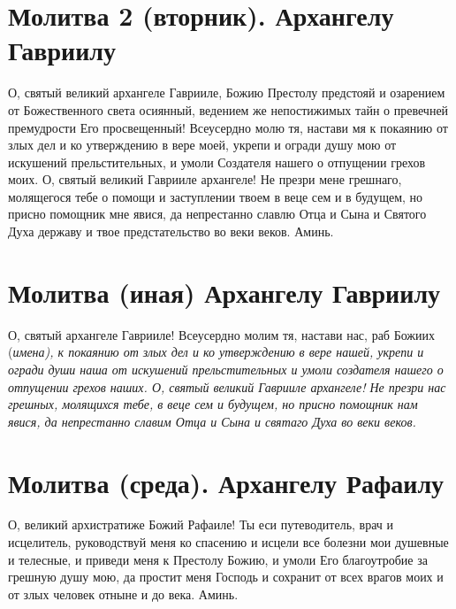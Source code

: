 \section{Молитва 2 (вторник).    Архангелу Гавриилу}\begin{mymulticols}
 


О, святый великий архангеле Гаврииле, Божию Престолу предстояй и озарением от Божественного света осиянный, ведением же непостижимых тайн о превечней премудрости Его просвещенный! Всеусердно молю тя, настави мя к покаянию от злых дел и ко утверждению в вере моей, укрепи и огради душу мою от искушений прельстительных, и умоли Создателя нашего о отпущении грехов моих. О, святый великий Гаврииле архангеле! Не презри мене грешнаго, молящегося тебе о помощи и заступлении твоем в веце сем и в будущем, но присно помощник мне явися, да непрестанно славлю Отца и Сына и Святого Духа державу и твое предстательство во веки веков. Аминь.


\end{mymulticols}

\section{Молитва (иная) Архангелу Гавриилу}\begin{mymulticols}
 


О, святый архангеле Гаврииле! Всеусердно молим тя, настави нас, раб Божиих (\itshape имена\normalfont{}), к покаянию от злых дел и ко утверждению в вере нашей, укрепи и огради души наша от искушений прельстительных и умоли создателя нашего о отпущении грехов наших. О, святый великий Гаврииле архангеле! Не презри нас грешных, молящихся тебе, в веце сем и будущем, но присно помощник нам явися, да непрестанно славим Отца и Сына и святаго Духа во веки веков.

\end{mymulticols}

\mychapterending



 

\section{Молитва (среда).     Архангелу Рафаилу}\begin{mymulticols}
 


О, великий архистратиже Божий Рафаиле! Ты еси путеводитель, врач и исцелитель, руководствуй меня ко спасению и исцели все болезни мои душевные и телесные, и приведи меня к Престолу Божию, и умоли Его благоутробие за грешную душу мою, да простит меня Господь и сохранит от всех врагов моих и от злых человек отныне и до века. Аминь.

\end{mymulticols}

